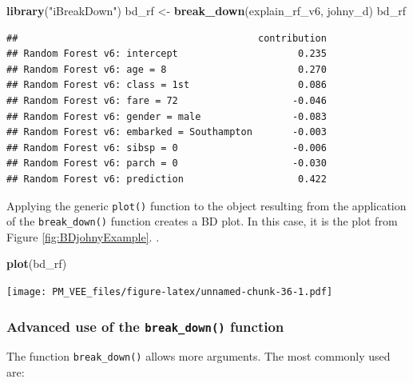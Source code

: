 \documentclass[12pt,]{krantz}
\newenvironment{Shaded}{\begin{snugshade}}{\end{snugshade}}
\newcommand{\KeywordTok}[1]{\textcolor[rgb]{0.13,0.29,0.53}{\textbf{#1}}}
\newcommand{\NormalTok}[1]{#1}
\newcommand{\StringTok}[1]{\textcolor[rgb]{0.31,0.60,0.02}{#1}}
\begin{document}
\begin{Shaded}
\begin{Highlighting}[]
\KeywordTok{library}\NormalTok{(}\StringTok{"iBreakDown"}\NormalTok{)}
\NormalTok{bd_rf <-}\StringTok{ }\KeywordTok{break_down}\NormalTok{(explain_rf_v6, johny_d)}
\NormalTok{bd_rf}
\end{Highlighting}
\end{Shaded}

\begin{verbatim}
##                                          contribution
## Random Forest v6: intercept                     0.235
## Random Forest v6: age = 8                       0.270
## Random Forest v6: class = 1st                   0.086
## Random Forest v6: fare = 72                    -0.046
## Random Forest v6: gender = male                -0.083
## Random Forest v6: embarked = Southampton       -0.003
## Random Forest v6: sibsp = 0                    -0.006
## Random Forest v6: parch = 0                    -0.030
## Random Forest v6: prediction                    0.422
\end{verbatim}

Applying the generic \texttt{plot()} function to the object resulting from the application of the \texttt{break\_down()} function creates a BD plot. In this case, it is the plot from Figure \ref{fig:BDjohnyExample}.
.

\begin{Shaded}
\begin{Highlighting}[]
\KeywordTok{plot}\NormalTok{(bd_rf) }
\end{Highlighting}
\end{Shaded}

\texttt{[image: PM\_VEE\_files/figure-latex/unnamed-chunk-36-1.pdf]}

\hypertarget{advanced-use-of-the-break_down-function}{%
\subsubsection{\texorpdfstring{Advanced use of the \texttt{break\_down()} function}{Advanced use of the break\_down() function}}\label{advanced-use-of-the-break_down-function}}

The function \texttt{break\_down()} allows more arguments. The most commonly used are:
\end{document}
